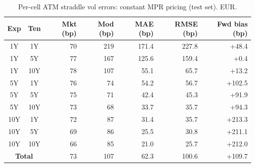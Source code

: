 \begin{table}[H]
\centering
\caption{Per-cell ATM straddle vol errors: constant MPR pricing (test set). EUR.}
\label{tab:constant_mpr_per_cell_test}
\small
\begin{tabular}{@{}ccrrrrr@{}}
\toprule
\textbf{Exp} & \textbf{Ten} & \textbf{Mkt (bp)} & \textbf{Mod (bp)} & \textbf{MAE (bp)} & \textbf{RMSE (bp)} & \textbf{Fwd bias (bp)} \\
\midrule
  1Y & 1Y & 70 & 219 & 171.4 & 227.8 & +48.4 \\
  1Y & 5Y & 77 & 167 & 125.6 & 159.4 & +0.4 \\
  1Y & 10Y & 78 & 107 & 55.1 & 65.7 & +13.2 \\
  \midrule
  5Y & 1Y & 76 & 74 & 54.2 & 56.7 & +102.5 \\
  5Y & 5Y & 75 & 71 & 42.4 & 45.3 & +91.9 \\
  5Y & 10Y & 73 & 68 & 33.7 & 35.7 & +94.3 \\
  \midrule
  10Y & 1Y & 72 & 87 & 31.4 & 35.7 & +213.3 \\
  10Y & 5Y & 69 & 86 & 25.5 & 30.8 & +211.1 \\
  10Y & 10Y & 66 & 85 & 21.0 & 25.7 & +212.0 \\
  \midrule
  \multicolumn{2}{c}{\textbf{Total}} & 73 & 107 & 62.3 & 100.6 & +109.7 \\
\bottomrule
\end{tabular}
\end{table}